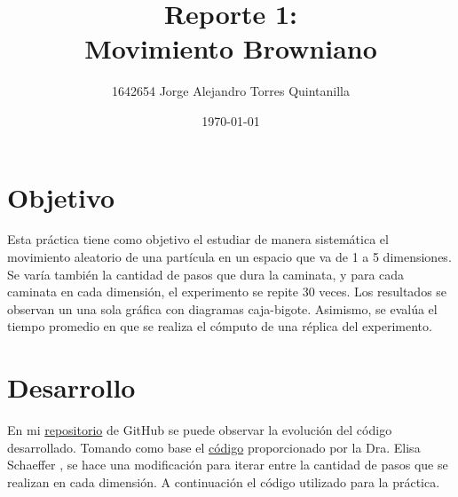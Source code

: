 \documentclass{article}
\title{Reporte 1:\\Movimiento Browniano}
\author{1642654 Jorge Alejandro Torres Quintanilla}
\date{\today}
\begin{document}
\maketitle

\section{Objetivo}
Esta pr\'actica tiene como objetivo el estudiar de manera sistem\'atica el movimiento aleatorio de una part\'icula en un espacio que va de 1 a 5 dimensiones. Se var\'ia tambi\'en la cantidad de pasos que dura la caminata, y para cada caminata en cada dimensi\'on, el experimento se repite 30 veces. Los resultados se observan un una sola gr\'afica con diagramas caja-bigote. Asimismo, se eval\'ua el tiempo promedio en que se realiza el c\'omputo de una r\'eplica del experimento.

\section{Desarrollo}
En mi \href{https://github.com/FeroxDeitas/Simulacion-Nano/tree/main/Tareas/P1}{repositorio} de GitHub se puede observar la evoluci\'on del c\'odigo desarrollado. Tomando como base el \href{https://github.com/satuelisa/Simulation/blob/master/BrownianMotion/sinpar.py}{c\'odigo} proporcionado por la Dra. Elisa Schaeffer \cite{elisa1}, se hace una modificaci\'on para iterar entre la cantidad de pasos que se realizan en cada dimensi\'on. A continuaci\'on el c\'odigo utilizado para la pr\'actica.
\end{document}
